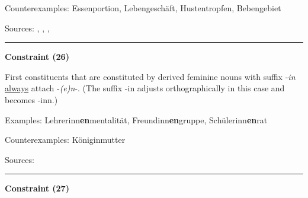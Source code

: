 \noindent
Counterexamples: Essen{\zeroLinker}portion, Leben{\zeroLinker}geschäft, Husten{\zeroLinker}tropfen, Beben{\zeroLinker}gebiet

\vspace{0.3em}

\noindent
Sources: \citet[230]{eisenberg_2013}, \citet[107]{kuerschner_2005}, \citet[78]{nuebling_szczepaniak_2013}, \citet[89]{ortner_mueller-bollhagen_1991}


\hrule




\vspace{0.4em}

\begin{center}
\textbf{Constraint (26)}
\end{center}

\noindent
First constituents that are constituted by derived feminine nouns with suffix -\textit{in} \underline{always} attach -\textit{(e)n}-. (The suffix -in adjusts orthographically in this case and becomes -inn.)
\vspace{0.35em}


\vspace{0.3em}

\noindent
Examples: Lehrerinn\textbf{en}mentalität, Freundinn\textbf{en}gruppe, Schülerinn\textbf{en}rat

\noindent
Counterexamples: Königin{\zeroLinker}mutter

\vspace{0.3em}

\noindent
Sources: \citet[94]{ortner_mueller-bollhagen_1991}


\hrule




\vspace{0.4em}

\begin{center}
\textbf{Constraint (27)}
\end{center}

